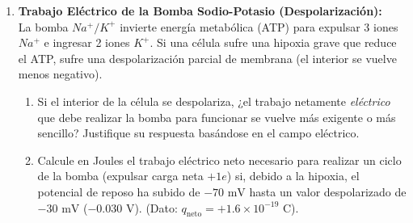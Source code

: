 \documentclass[11pt,letterpaper]{article}
\begin{document}
\begin{enumerate}[leftmargin=*]
    \vspace{0.2cm}

    \item \textbf{Trabajo Eléctrico de la Bomba Sodio-Potasio (Despolarización):}\\
    La bomba $Na^+/K^+$ invierte energía metabólica (ATP) para expulsar 3 iones $Na^+$ e ingresar 2 iones $K^+$. Si una célula sufre una hipoxia grave que reduce el ATP, sufre una despolarización parcial de membrana (el interior se vuelve menos negativo).
    \begin{enumerate}
        \item Si el interior de la célula se despolariza, ¿el trabajo netamente \textit{eléctrico} que debe realizar la bomba para funcionar se vuelve más exigente o más sencillo? Justifique su respuesta basándose en el campo eléctrico.
        \item Calcule en Joules el trabajo eléctrico neto necesario para realizar un ciclo de la bomba (expulsar carga neta $+1e$) si, debido a la hipoxia, el potencial de reposo ha subido de $-70 \text{ mV}$ hasta un valor despolarizado de $-30 \text{ mV}$ ($-$0.030 V). (Dato: $q_{\text{neto}} = +1.6 \times 10^{-19} \text{ C}$).
    \end{enumerate}

\end{enumerate}
\end{document}
